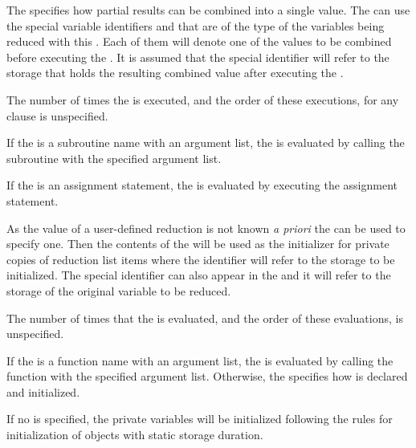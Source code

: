 The  specifies how partial results can be combined into a single value. The
 can use the special variable identifiers  and  that are of the
type of the variables being reduced with this . Each of them will
denote one of the values to be combined before executing the . It is assumed
that the special  identifier will refer to the storage that holds the resulting
combined value after executing the .

The number of times the  is executed, and the order of these executions, for
any  clause is unspecified.

\begin{fortranspecific}
If the  is a subroutine name with an argument list, the  is evaluated by
calling the subroutine with the specified argument list.

If the  is an assignment statement, the  is evaluated by executing the
assignment statement.
\end{fortranspecific}

As the  value of a user-defined reduction is not known \emph{a priori} the
 can be used to specify one. Then the contents of the 
will be used as the initializer for private copies of reduction list items where the
 identifier will refer to the storage to be initialized. The special identifier
 can also appear in the  and it will refer to the storage of the
original variable to be reduced.

The number of times that the  is evaluated, and the order of these
evaluations, is unspecified.

\begin{ccppspecific}
If the  is a function name with an argument list, the  is
evaluated by calling the function with the specified argument list. Otherwise, the
 specifies how  is declared and initialized.
\end{ccppspecific}

\begin{cspecific}
If no  is specified, the private variables will be initialized following the
rules for initialization of objects with static storage duration.
\end{cspecific}


